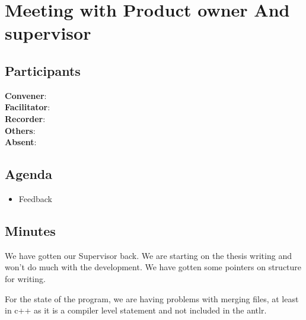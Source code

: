 \section*{Meeting with Product owner And supervisor}
\subsection*{Participants}
\textbf{Convener}: \productowner{}\\
\textbf{Facilitator}: \facilitator{}  \\
\textbf{Recorder}: \scrummaster{}  \\
\textbf{Others}: \groupleader{} \\
\textbf{Absent}: 

\subsection*{Agenda}
\begin{itemize}
    \item Feedback
\end{itemize}

\subsection*{Minutes}

We have gotten our Supervisor back.
We are starting on the thesis writing and won't do much with the development. 
We have gotten some pointers on structure for writing. 

For the state of the program, we are having problems with merging files, at least in c++ as it is a compiler level statement and not included in the antlr.
\newpage